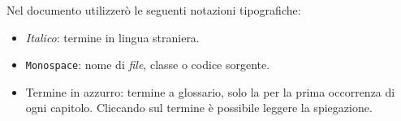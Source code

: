 Nel documento utilizzerò le seguenti notazioni tipografiche:
\begin{itemize}
	\item \textit{Italico}: termine in lingua straniera.
	\item \texttt{Monospace}: nome di \textit{file}, classe o codice sorgente.
	\item Termine in azzurro: termine a glossario, solo la per la prima occorrenza di ogni capitolo. Cliccando sul termine è possibile leggere la spiegazione.
\end{itemize}

%
%

\endgroup			

\vfill

